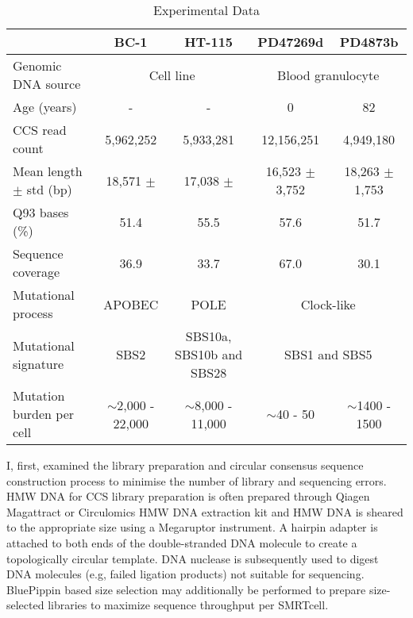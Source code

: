 \begin{table}[h]
\caption{Experimental Data}
\label{tab:CCS-sequence-statistics}
\begin{adjustbox}{max width=1.1\textwidth,center}
\begin{tabular}{l|cccc}
                                     & BC-1 & HT-115 & PD47269d & PD4873b \\ \hline
Genomic DNA source                   & \multicolumn{2}{c}{Cell line} & \multicolumn{2}{c}{Blood granulocyte} \\  \hline
Age (years)                 		 & - & - & 0 & 82  \\ \hline
CCS read count                       &  5,962,252 &  5,933,281 & 12,156,251 & 4,949,180 \\ \hline
Mean length $\pm$ std (bp)  & 18,571 $\pm$     & 17,038 $\pm$   &  16,523 $\pm$ 3,752 & 18,263 $\pm$ 1,753 \\ \hline
Q93 bases (\%) 						 & 51.4 & 55.5 & 57.6 & 51.7 \\ \hline
Sequence coverage 				     & 36.9 & 33.7 & 67.0 & 30.1 \\ \hline
Mutational process   			     & APOBEC & POLE & \multicolumn{2}{c}{Clock-like} \\ \hline
Mutational signature 				 & SBS2   & SBS10a, SBS10b and SBS28 & \multicolumn{2}{c}{SBS1 and SBS5} \\ \hline
Mutation burden per cell 		     & $\sim$2,000 - 22,000 & $\sim$8,000 - 11,000 & $\sim$40 - 50 & $\sim$1400 - 1500 \\ \hline 
\end{tabular}
\end{adjustbox} 
\end{table}

I, first, examined the library preparation and circular consensus sequence construction process to minimise the number of library and sequencing errors. HMW DNA for CCS library preparation is often prepared through Qiagen Magattract or Circulomics HMW DNA extraction kit and HMW DNA is sheared to the appropriate size using a Megaruptor instrument. A hairpin adapter is attached to both ends of the double-stranded DNA molecule to create a topologically circular template. DNA nuclease is subsequently used to digest DNA molecules (e.g, failed ligation products) not suitable for sequencing. BluePippin based size selection may additionally be performed to prepare size-selected libraries to maximize sequence throughput per SMRTcell. 

